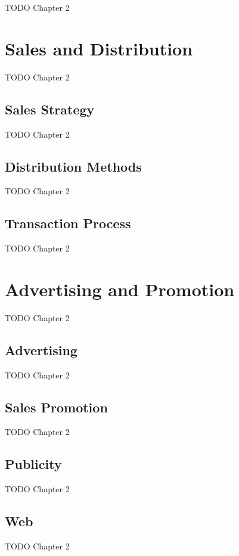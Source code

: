 TODO Chapter 2


\section{Sales and Distribution}

TODO Chapter 2

\subsection{Sales Strategy}

TODO Chapter 2

\subsection{Distribution Methods}

TODO Chapter 2

\subsection{Transaction Process}

TODO Chapter 2


\section{Advertising and Promotion}

TODO Chapter 2

\subsection{Advertising}

TODO Chapter 2

\subsection{Sales Promotion}

TODO Chapter 2

\subsection{Publicity}

TODO Chapter 2

\subsection{Web}

TODO Chapter 2
